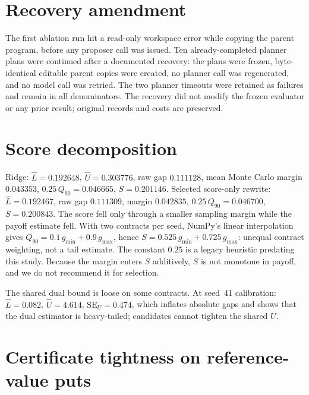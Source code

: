 \documentclass{article}
\begin{document}
\section{Recovery amendment}
\label{app:recovery}

The first ablation run hit a read-only workspace error while copying the parent program, before any proposer call was issued. Ten already-completed planner plans were continued after a documented recovery: the plans were frozen, byte-identical editable parent copies were created, no planner call was regenerated, and no model call was retried. The two planner timeouts were retained as failures and remain in all denominators. The recovery did not modify the frozen evaluator or any prior result; original records and costs are preserved.

\section{Score decomposition}
\label{app:decomp}

\begin{table}[H]
\centering
\footnotesize
\setlength{\tabcolsep}{4pt}
\caption{Calibration-panel score decomposition; seed-17 rows have $K = 1$.}
\end{table}

\noindent Ridge: $\hat L = 0.192648$, $\hat U = 0.303776$, raw gap $0.111128$, mean Monte
Carlo margin $0.043353$, $0.25\,Q_{90} = 0.046665$, $S = 0.201146$. Selected score-only
rewrite: $\hat L = 0.192467$, raw gap $0.111309$, margin $0.042835$,
$0.25\,Q_{90} = 0.046700$, $S = 0.200843$. The score fell only through a smaller sampling
margin while the payoff estimate fell. With two contracts per seed, NumPy's linear
interpolation gives $Q_{90} = 0.1\,g_{\min} + 0.9\,g_{\max}$, hence
$S = 0.525\,g_{\min} + 0.725\,g_{\max}$: unequal contract weighting, not a tail estimate.
The constant $0.25$ is a legacy heuristic predating this study. Because the margin enters $S$ additively, $S$ is not monotone in payoff, and we do not recommend it for selection.

The shared dual bound is loose on some contracts. At seed~41 calibration: $\hat L = 0.082$, $\hat U = 4.614$, $\mathrm{SE}_U = 0.474$, which inflates absolute gaps and shows that the dual estimator is heavy-tailed; candidates cannot tighten the shared $U$.

\section{Certificate tightness on reference-value puts}
\label{app:tightness}
\end{document}
